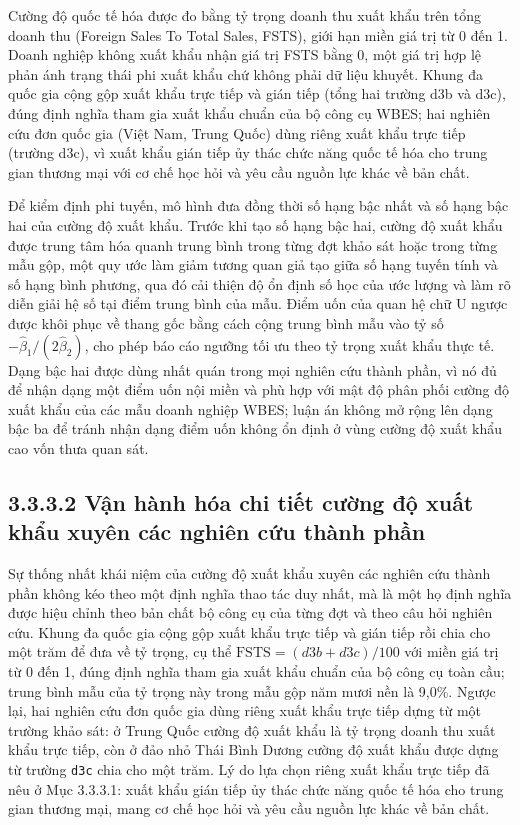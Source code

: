 \documentclass[
  a4paper,
  13pt]{extreport}
\begin{document}
Cường độ quốc tế hóa được đo bằng tỷ trọng doanh thu xuất khẩu trên tổng
doanh thu (Foreign Sales To Total Sales, FSTS), giới hạn miền giá trị từ
0 đến 1. Doanh nghiệp không xuất khẩu nhận giá trị FSTS bằng 0, một giá
trị hợp lệ phản ánh trạng thái phi xuất khẩu chứ không phải dữ liệu
khuyết. Khung đa quốc gia cộng gộp xuất khẩu trực tiếp và gián tiếp
(tổng hai trường d3b và d3c), đúng định nghĩa tham gia xuất khẩu chuẩn
của bộ công cụ WBES; hai nghiên cứu đơn quốc gia (Việt Nam, Trung Quốc)
dùng riêng xuất khẩu trực tiếp (trường d3c), vì xuất khẩu gián tiếp ủy
thác chức năng quốc tế hóa cho trung gian thương mại với cơ chế học hỏi
và yêu cầu nguồn lực khác về bản chất.

Để kiểm định phi tuyến, mô hình đưa đồng thời số hạng bậc nhất và số
hạng bậc hai của cường độ xuất khẩu. Trước khi tạo số hạng bậc hai,
cường độ xuất khẩu được trung tâm hóa quanh trung bình trong từng đợt
khảo sát hoặc trong từng mẫu gộp, một quy ước làm giảm tương quan giả
tạo giữa số hạng tuyến tính và số hạng bình phương, qua đó cải thiện độ
ổn định số học của ước lượng và làm rõ diễn giải hệ số tại điểm trung
bình của mẫu. Điểm uốn của quan hệ chữ U ngược được khôi phục về thang
gốc bằng cách cộng trung bình mẫu vào tỷ số
\(-\hat\beta_1 / (2\hat\beta_2)\), cho phép báo cáo ngưỡng tối ưu theo
tỷ trọng xuất khẩu thực tế. Dạng bậc hai được dùng nhất quán trong mọi
nghiên cứu thành phần, vì nó đủ để nhận dạng một điểm uốn nội miền và
phù hợp với mật độ phân phối cường độ xuất khẩu của các mẫu doanh nghiệp
WBES; luận án không mở rộng lên dạng bậc ba để tránh nhận dạng điểm uốn
không ổn định ở vùng cường độ xuất khẩu cao vốn thưa quan sát.

\hypertarget{vux1eadn-huxe0nh-huxf3a-chi-tiux1ebft-cux1b0ux1eddng-ux111ux1ed9-xuux1ea5t-khux1ea9u-xuyuxean-cuxe1c-nghiuxean-cux1ee9u-thuxe0nh-phux1ea7n}{%
\subsection{3.3.3.2 Vận hành hóa chi tiết cường độ xuất khẩu xuyên các
nghiên cứu thành
phần}\label{vux1eadn-huxe0nh-huxf3a-chi-tiux1ebft-cux1b0ux1eddng-ux111ux1ed9-xuux1ea5t-khux1ea9u-xuyuxean-cuxe1c-nghiuxean-cux1ee9u-thuxe0nh-phux1ea7n}}

Sự thống nhất khái niệm của cường độ xuất khẩu xuyên các nghiên cứu
thành phần không kéo theo một định nghĩa thao tác duy nhất, mà là một họ
định nghĩa được hiệu chỉnh theo bản chất bộ công cụ của từng đợt và theo
câu hỏi nghiên cứu. Khung đa quốc gia cộng gộp xuất khẩu trực tiếp và
gián tiếp rồi chia cho một trăm để đưa về tỷ trọng, cụ thể
\(\mathrm{FSTS} = (d3b + d3c)/100\) với miền giá trị từ 0 đến 1, đúng
định nghĩa tham gia xuất khẩu chuẩn của bộ công cụ toàn cầu; trung bình
mẫu của tỷ trọng này trong mẫu gộp năm mươi nền là 9,0\%. Ngược lại, hai
nghiên cứu đơn quốc gia dùng riêng xuất khẩu trực tiếp dựng từ một
trường khảo sát: ở Trung Quốc cường độ xuất khẩu là tỷ trọng doanh thu
xuất khẩu trực tiếp, còn ở đảo nhỏ Thái Bình Dương cường độ xuất khẩu
được dựng từ trường \texttt{d3c} chia cho một trăm. Lý do lựa chọn riêng
xuất khẩu trực tiếp đã nêu ở Mục 3.3.3.1: xuất khẩu gián tiếp ủy thác
chức năng quốc tế hóa cho trung gian thương mại, mang cơ chế học hỏi và
yêu cầu nguồn lực khác về bản chất.
\end{document}
